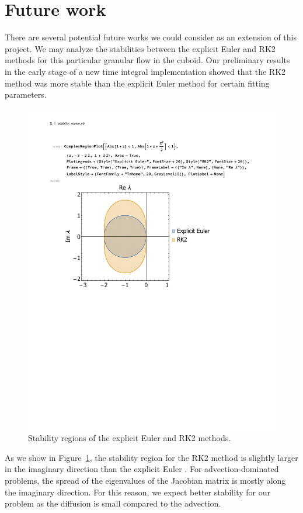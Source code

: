 \section{Future work}
There are several potential future works we could consider as an extension of this project. 
We may analyze the stabilities between the explicit Euler and RK2 methods for this particular granular flow in the cuboid.
Our preliminary results in the early stage of a new time integral implementation showed that the RK2 method was more stable than the explicit Euler method for certain fitting parameters.
\begin{figure}[ht]
  \begin{center}
    \includegraphics[scale=0.65]{figures/fig_stability_RK_Euler.pdf}
    \end{center}
  \caption{Stability regions of the explicit Euler and RK2 methods. }
  \label{fig_stability_RK_Euler}
\end{figure}
As we show in Figure~\ref{fig_stability_RK_Euler}, the stability region for the RK2 method is slightly larger in the imaginary direction than the explicit Euler \cite{griffiths_numerical_2010}. For advection-dominated problems, the spread of the eigenvalues of the Jacobian matrix is mostly along the imaginary direction. For this reason, we expect better stability for our problem as the diffusion is small compared to the advection. 
